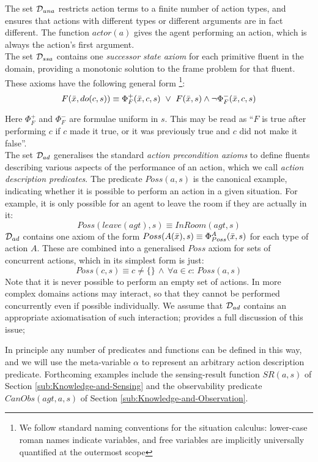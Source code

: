 The set $\mathcal{D}_{una}$ restricts action terms to a finite number of
action types, and ensures that actions with different types or different
arguments are in fact different. The function $actor(a)$ gives the
agent performing an action, which is always the action's first argument.\\


The set $\mathcal{D}_{ssa}$ contains one \emph{successor state axiom} for
each primitive fluent in the domain, providing a monotonic solution
to the frame problem for that fluent. These axioms have the following
general form%
\footnote{We follow standard naming conventions for the situation calculus:
lower-case roman names indicate variables, and free variables are
implicitly universally quantified at the outermost scope%
}: \[
F(\bar{x},do(c,s))\equiv\Phi_{F}^{+}(\bar{x},c,s)\,\,\vee\,\, F(\bar{x},s)\wedge\neg\Phi_{F}^{-}(\bar{x},c,s)\]


Here $\Phi_{F}^{+}$ and $\Phi_{F}^{-}$ are formulae uniform in $s$.
This may be read as {}``$F$ is true after performing $c$ if $c$
made it true, or it was previously true and $c$ did not make it false''.\\


The set $\mathcal{D}_{ad}$ generalises the standard \emph{action precondition
axioms} \cite{pirri99contributions_sitcalc} to define fluents describing
various aspects of the performance of an action, which we call \emph{action
description predicates}. The predicate $Poss(a,s)$ is the canonical
example, indicating whether it is possible to perform an action in
a given situation. For example, it is only possible for an agent to
leave the room if they are actually in it:\[
Poss(leave(agt),s)\equiv InRoom(agt,s)\]
 $\mathcal{D}_{ad}$ contains one axiom of the form $Poss(A(\bar{x}),s)\equiv\Phi_{Poss}^{A}(\bar{x},s)$
for each type of action $A$. These are combined into a generalised
$Poss$ axiom for sets of concurrent actions, which in its simplest
form is just:\[
Poss(c,s)\equiv c\neq\{\}\,\wedge\,\forall a\in c:\, Poss(a,s)\]
 Note that it is never possible to perform an empty set of actions.
In more complex domains actions may interact, so that they cannot
be performed concurrently even if possible individually. We assume
that $\mathcal{D}_{ad}$ contains an appropriate axiomatisation of such interaction;
\cite{pinto94temporal} provides a full discussion of this issue;

In principle any number of predicates and functions can be defined
in this way, and we will use the meta-variable $\alpha$ to represent
an arbitrary action description predicate. Forthcoming examples include
the sensing-result function $SR(a,s)$ of Section \ref{sub:Knowledge-and-Sensing}
and the observability predicate $CanObs(agt,a,s)$ of Section \ref{sub:Knowledge-and-Observation}.

